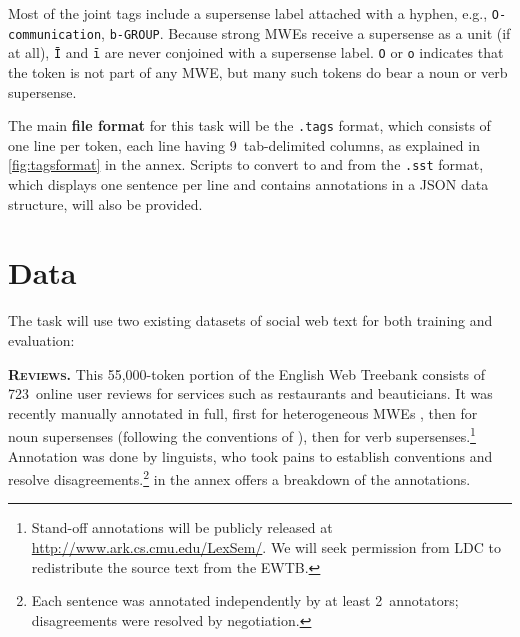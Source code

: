\documentclass[11pt]{article}
\newcommand{\ensuretext}[1]{#1}
\newcommand{\nssmarker}{\ensuretext{\textcolor{magenta}{\ensuremath{^{\textsc{NS}}_{\textsc{S}}}}}}
\newcommand{\arkcomment}[3]{\ensuretext{\textcolor{#3}{[#1 #2]}}}
\newcommand{\nss}[1]{\arkcomment{\nssmarker}{#1}{magenta}}
\newcommand{\shortversion}[1]{#1}
\newcommand{\longversion}[1]{} %
\begin{document}
Most of the joint tags include a supersense label attached with a hyphen, 
e.g., \texttt{O-communication}, \texttt{b-GROUP}.
Because strong MWEs receive a supersense as a unit (if at all), 
\texttt{Ī} and \texttt{ī} are never conjoined with a supersense label.
\texttt{O} or \texttt{o} indicates that the token is not part of any MWE, 
but many such tokens do bear a noun or verb supersense.
\longversion{Of course, the supersenses in this task only cover noun and verb expressions, 
so plain \texttt{O} will be frequent, as will plain \texttt{B} and \texttt{Ī} for (e.g.) PP idioms.}

The main \textbf{file format} for this task will be the \texttt{.tags} format, 
which consists of one line per token, each line having 9~tab-delimited columns, 
as explained in \cref{fig:tagsformat} in the annex.
Scripts to convert to and from the \texttt{.sst} format, which displays one sentence per line 
and contains annotations in a JSON data structure, will also be provided.
\longversion{All file formats are UTF-8 encoded.}

\section{Data}\label{sec:data}

The task will use two existing datasets of social web text for both training and evaluation: 

\textbf{\textsc{Reviews}.} This 55,000-token portion of the English Web Treebank \citep[EWTB;][]{ewtb} 
consists of 723~online user reviews for services such as restaurants and beauticians.\longversion{\footnote{Each review is a separate document; 
no metadata about the reviews is available. EWTB provides sentence segmentation, word tokenization, and a Penn Treebank--style 
syntactic parse of each sentence.}}
It was recently manually annotated in full, first for heterogeneous MWEs \citep[released as the CMWE Corpus]{schneider-14-corpus}, 
then for noun supersenses (following the conventions of \citealp{schneider-12}), then for verb supersenses.\footnote{Stand-off annotations 
will be publicly released at \url{http://www.ark.cs.cmu.edu/LexSem/}. 
We will seek permission from LDC to redistribute the source text from the EWTB.} 
Annotation was done by linguists, who took pains to establish conventions and resolve disagreements.\footnote{Each 
sentence was annotated independently by at least 2~annotators; disagreements were resolved by negotiation.} 
\longversion{Annotators found approximately 3,500~MWEs, 9,000~noun expressions, 8,000~main verb expressions, and 1,000~auxiliary verbs. 
(\Cref{tbl:reviews} in the annex offers a more detailed breakdown.)}\shortversion{ in the annex 
offers a breakdown of the annotations.}
\longversion{15\% of MWEs contain a gap. \nss{proportion strong/weak}} 
\end{document}
